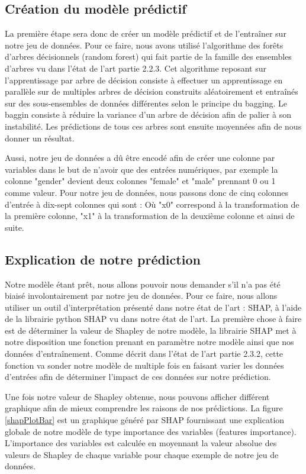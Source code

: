 \subsection{Création du modèle prédictif}
La première étape sera donc de créer un modèle prédictif et de l'entraîner sur notre jeu de données. Pour ce faire, nous avons utilisé l'algorithme des forêts d'arbres décisionnels (random forest) qui fait partie de la famille des ensembles d'arbres vu dans l'état de l'art partie 2.2.3. Cet algorithme reposant sur l'apprentissage par arbre de décision consiste à effectuer un apprentissage en parallèle sur de multiples arbres de décision construits aléatoirement et entraînés sur des sous-ensembles de données différentes selon le principe du bagging. Le baggin consiste à réduire la variance d'un arbre de décision afin de palier à son instabilité. Les prédictions de tous ces arbres sont ensuite moyennées afin de nous donner un résultat.\par
Aussi, notre jeu de données a dû être encodé afin de créer une colonne par variables dans le but de n'avoir que des entrées numériques, par exemple la colonne "gender" devient deux colonnes "female" et "male" prennant 0 ou 1 comme valeur. Pour notre jeu de données, nous passons donc de cinq colonnes d'entrée à dix-sept colonnes qui sont : \medbreak
Où "x0" correspond à la transformation de la première colonne, "x1" à la transformation de la deuxième colonne et ainsi de suite.

\subsection{Explication de notre prédiction}
Notre modèle étant prêt, nous allons pouvoir nous demander s'il n'a pas été biaisé involontairement par notre jeu de données. Pour ce faire, nous allons utiliser un outil d'interprétation présenté dans notre état de l'art : SHAP, à l'aide de la librairie python SHAP vu dans notre état de l'art. La première chose à faire est de déterminer la valeur de Shapley de notre modèle, la librairie SHAP met à notre disposition une fonction prenant en paramètre notre modèle ainsi que nos données d'entraînement. Comme décrit dans l'état de l'art partie 2.3.2, cette fonction va sonder notre modèle de multiple fois en faisant varier les données d'entrées afin de déterminer l'impact de ces données sur notre prédiction.\par
Une fois notre valeur de Shapley obtenue, nous pouvons afficher différent graphique afin de mieux comprendre les raisons de nos prédictions. La figure \ref{shapPlotBar} est un graphique généré par SHAP fournissant une explication globale de notre modèle de type importance des variables (features importance). L’importance des variables est calculée en moyennant la valeur absolue des valeurs de Shapley de chaque variable pour chaque exemple de notre jeu de données.

